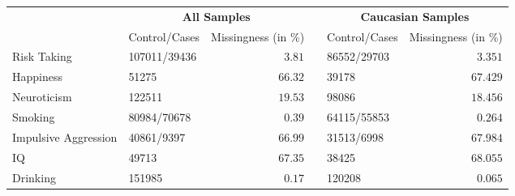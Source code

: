 \begin{tabular}{llrclr}
\hline\hline
\multicolumn{1}{l}{\bfseries }&\multicolumn{2}{c}{\bfseries All Samples}&\multicolumn{1}{c}{\bfseries }&\multicolumn{2}{c}{\bfseries Caucasian Samples}\tabularnewline
\cline{2-3} \cline{5-6}
\multicolumn{1}{l}{}&\multicolumn{1}{c}{Control/Cases}&\multicolumn{1}{c}{Missingness (in \%)}&\multicolumn{1}{c}{}&\multicolumn{1}{c}{Control/Cases}&\multicolumn{1}{c}{Missingness (in \%)}\tabularnewline
\hline
Risk Taking&107011/39436&$ 3.81$&&86552/29703&$ 3.351$\tabularnewline
Happiness&51275&$66.32$&&39178&$67.429$\tabularnewline
Neuroticism&122511&$19.53$&&98086&$18.456$\tabularnewline
Smoking&80984/70678&$ 0.39$&&64115/55853&$ 0.264$\tabularnewline
Impulsive Aggression&40861/9397&$66.99$&&31513/6998&$67.984$\tabularnewline
IQ&49713&$67.35$&&38425&$68.055$\tabularnewline
Drinking&151985&$ 0.17$&&120208&$ 0.065$\tabularnewline
\hline
\end{tabular}
